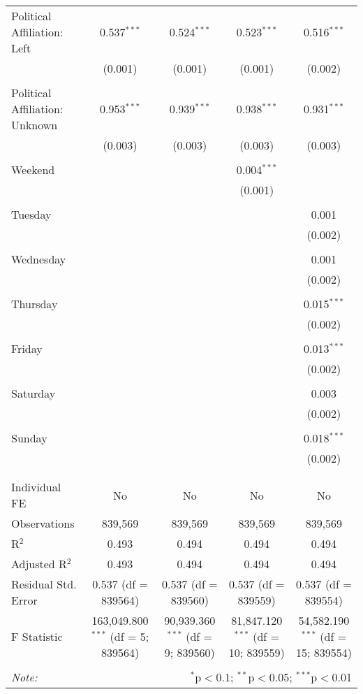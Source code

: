 \documentclass[
]{article}
\begin{document}
\begin{table}[!htbp]
{\begin{tabular}{@{\extracolsep{5pt}}lcccc}
 Political Affiliation: Left & 0.537$^{***}$ & 0.524$^{***}$ & 0.523$^{***}$ & 0.516$^{***}$ \\ 
  & (0.001) & (0.001) & (0.001) & (0.002) \\ 
  & & & & \\ 
 Political Affiliation: Unknown & 0.953$^{***}$ & 0.939$^{***}$ & 0.938$^{***}$ & 0.931$^{***}$ \\ 
  & (0.003) & (0.003) & (0.003) & (0.003) \\ 
  & & & & \\ 
 Weekend &  &  & 0.004$^{***}$ &  \\ 
  &  &  & (0.001) &  \\ 
  & & & & \\ 
 Tuesday &  &  &  & 0.001 \\ 
  &  &  &  & (0.002) \\ 
  & & & & \\ 
 Wednesday &  &  &  & 0.001 \\ 
  &  &  &  & (0.002) \\ 
  & & & & \\ 
 Thursday &  &  &  & 0.015$^{***}$ \\ 
  &  &  &  & (0.002) \\ 
  & & & & \\ 
 Friday &  &  &  & 0.013$^{***}$ \\ 
  &  &  &  & (0.002) \\ 
  & & & & \\ 
 Saturday &  &  &  & 0.003 \\ 
  &  &  &  & (0.002) \\ 
  & & & & \\ 
 Sunday &  &  &  & 0.018$^{***}$ \\ 
  &  &  &  & (0.002) \\ 
  & & & & \\ 
\hline \\[-1.8ex] 
Individual FE & No & No & No & No \\ 
Observations & 839,569 & 839,569 & 839,569 & 839,569 \\ 
R$^{2}$ & 0.493 & 0.494 & 0.494 & 0.494 \\ 
Adjusted R$^{2}$ & 0.493 & 0.494 & 0.494 & 0.494 \\ 
Residual Std. Error & 0.537 (df = 839564) & 0.537 (df = 839560) & 0.537 (df = 839559) & 0.537 (df = 839554) \\ 
F Statistic & 163,049.800$^{***}$ (df = 5; 839564) & 90,939.360$^{***}$ (df = 9; 839560) & 81,847.120$^{***}$ (df = 10; 839559) & 54,582.190$^{***}$ (df = 15; 839554) \\ 
\hline 
\hline \\[-1.8ex] 
\textit{Note:}  & \multicolumn{4}{r}{$^{*}$p$<$0.1; $^{**}$p$<$0.05; $^{***}$p$<$0.01} \\ 
\end{tabular}
} 
\end{table} 
\newpage
\end{document}

